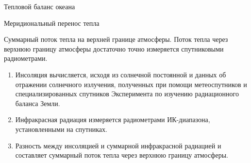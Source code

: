 \begin{chapter}{Тепловой баланс океана}
\begin{section}{Меридиональный перенос тепла}
\begin{paragraph}{Суммарный поток тепла на верхней границе атмосферы.}
Поток тепла через верхнюю границу атмосферы достаточно точно измеряется
спутниковыми радиометрами.
%
\begin{enumerate}
\item
Инсоляция вычисляется, исходя из солнечной постоянной и данных об отражении
солнечного излучения, полученных при помощи метеоспутников и 
специализированных спутников Эксперимента по изучению радиационного 
баланса Земли.
%

\item
Инфракрасная радиация измеряется радиометрами ИК-диапазона, установленными
на спутниках.
%

\item
Разность между инсоляцией и суммарной инфракрасной радиацией и составляет
суммарный поток тепла через верхнюю границу атмосферы.
%
\end{enumerate}
\end{paragraph}


\end{section}
\end{chapter}
